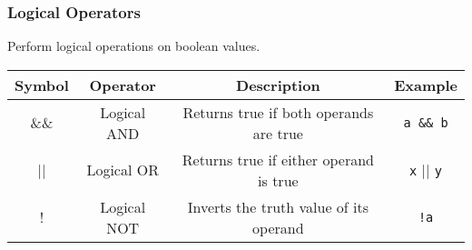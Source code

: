 \documentclass[11pt,A4]{article}
\begin{document}
            \subsubsection{Logical Operators} 
            Perform logical operations on boolean values.
            \begin{table}[h]
                \centering
                \setlength{\arrayrulewidth}{0.3mm}
                \renewcommand{\arraystretch}{1.2}
                \begin{tabular}{cccc}
                    \toprule
                    Symbol & Operator & Description & Example \\
                    \midrule
                    \&\& & Logical AND & Returns true if both operands are true & \verb|a && b| \\
                    \arrayrulecolor{gray!50}\cmidrule(lr){1-4}\arrayrulecolor{black}
                    || & Logical OR & Returns true if either operand is true & \verb|x| || \verb|y| \\
                    \arrayrulecolor{gray!50}\cmidrule(lr){1-4}\arrayrulecolor{black}
                    ! & Logical NOT & Inverts the truth value of its operand & \verb|!a| \\
                    \bottomrule
                \end{tabular}
            \end{table} 
            
\end{document}
